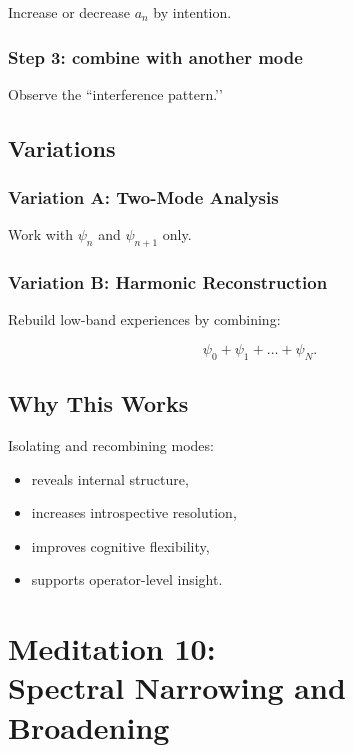 \documentclass[12pt]{article}
\begin{document}
Increase or decrease $a_n$ by intention.

\subsection*{Step 3: combine with another mode}

Observe the ``interference pattern.’’

\section{Variations}

\subsection{Variation A: Two-Mode Analysis}

Work with $\psi_n$ and $\psi_{n+1}$ only.

\subsection{Variation B: Harmonic Reconstruction}

Rebuild low-band experiences by combining:

\[
\psi_0 + \psi_1 + \dots + \psi_N.
\]

\section{Why This Works}

Isolating and recombining modes:

\begin{itemize}
    \item reveals internal structure,
    \item increases introspective resolution,
    \item improves cognitive flexibility,
    \item supports operator-level insight.
\end{itemize}

\newpage

\chapter{Meditation 10:\\ Spectral Narrowing and Broadening}
\end{document}
